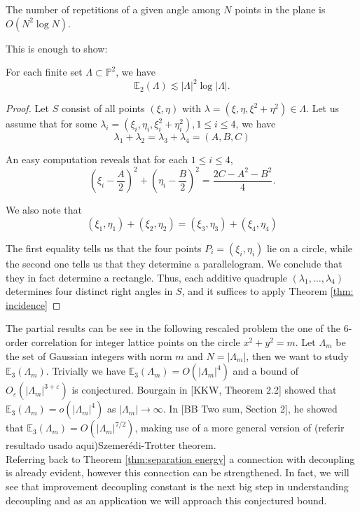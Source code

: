 \begin{thm}\label{thm: incidence}
    The number of repetitions of a given angle among $N$ points in the plane is $O\left(N^2 \log N\right)$.
\end{thm}
This is enough to show:
\begin{thm}
     For each finite set $\Lambda \subset \mathbb{P}^2$, we have
$$
\mathbb{E}_2(\Lambda) \lesssim|\Lambda|^2 \log |\Lambda| .
$$
\end{thm}
\begin{proof}
Let $S$ consist of all points $(\xi, \eta)$ with $\lambda=\left(\xi, \eta, \xi^2+\eta^2\right) \in \Lambda$. Let us assume that for some $\lambda_i=\left(\xi_i, \eta_i, \xi_i^2+\eta_i^2\right), 1 \leq i \leq 4$, we have
$$
\lambda_1+\lambda_2=\lambda_3+\lambda_4=(A, B, C)
$$

An easy computation reveals that for each $1 \leq i \leq 4$,
$$
\left(\xi_i-\frac{A}{2}\right)^2+\left(\eta_i-\frac{B}{2}\right)^2=\frac{2 C-A^2-B^2}{4} .
$$

We also note that
$$
\left(\xi_1, \eta_1\right)+\left(\xi_2, \eta_2\right)=\left(\xi_3, \eta_3\right)+\left(\xi_4, \eta_4\right)
$$

The first equality tells us that the four points $P_i=\left(\xi_i, \eta_i\right)$ lie on a circle, while the second one tells us that they determine a parallelogram. We conclude that they in fact determine a rectangle. Thus, each additive quadruple $\left(\lambda_1, \ldots, \lambda_4\right)$ determines four distinct right angles in $S$, and it suffices to apply Theorem \ref{thm: incidence}
\end{proof}

The partial results can be see in the following rescaled problem the one of the 6-order correlation for integer lattice points on the circle $x^2+y^2=m$. Let  $\Lambda_m$ be
the set of Gaussian integers with norm $m$ and $N=\left|\Lambda_m\right|$, then we want to study $\mathbb{E}_{3}(\Lambda_{m})$. Trivially we have $\mathbb{E}_{3}(\Lambda_{m})=O\left(|\Lambda_{m}|^4\right)$ and a bound of $O_{\varepsilon}\left(|\Lambda_{m}|^{3+\varepsilon}\right)$ is conjectured. Bourgain in [KKW, Theorem 2.2] showed that $\mathbb{E}_{3}(\Lambda_{m})=o\left(|\Lambda_{m}|^4\right)$ as $|\Lambda_{m}| \rightarrow \infty$. In [BB Two sum, Section 2], he showed that $\mathbb{E}_{3}(\Lambda_{m})=O\left(|\Lambda_{m}|^{7 / 2}\right)$, making use of a more general version of (referir resultado usado aqui)Szemerédi-Trotter theorem.\\


Referring back to Theorem \ref{thm:separation energy} a connection with decoupling is already evident, however this connection can be  strengthened. In fact, we will see that improvement decoupling constant is the next big step in understanding decoupling and as an application we will approach this conjectured bound.





